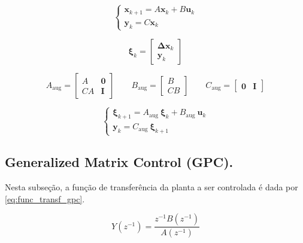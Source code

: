 \documentclass{article}
\begin{document}
\begin{equation}
  \begin{cases}
    \mathbf{x}_{k+1} = A \mathbf{x}_k + B \mathbf{u}_k \\
    \mathbf{y}_k = C \mathbf{x}_k
  \end{cases}
    \label{eq:ss_discreto}
\end{equation}

\begin{equation}
  \mathbf{\xi}_k = \begin{bmatrix}
    \mathbf{\Delta x}_k \\
    \mathbf{y}_k
  \end{bmatrix}
  \label{eq:estados_aug}
\end{equation}

\begin{equation}
  A_\mathrm{aug} = \begin{bmatrix}
    A & \mathbf{0} \\
    C A & \mathbf{I}
  \end{bmatrix} \qquad 
    B_\mathrm{aug} = \begin{bmatrix}
      B \\
      C B
    \end{bmatrix} \qquad
    C_\mathrm{aug} = \begin{bmatrix}
      \mathbf{0} & \mathbf{I}
    \end{bmatrix}
    \label{eq:matrizes_aug}
\end{equation}


\begin{equation}
  \begin{cases}
    \mathbf{\xi}_{k+1} = A_\mathrm{aug}\ \mathbf{\xi}_{k}+ B_\mathrm{aug}\ \mathbf{u}_k \\
    \mathbf{y}_k = C_\mathrm{aug}\ \mathbf{\xi}_{k+1}
  \end{cases}
  \label{eq:ss_discreto_aug}
\end{equation}

\subsection{Generalized Matrix Control (GPC).}

Nesta subseção, a função de transferência da planta a ser controlada é dada por \eqref{eq:func_transf_gpc}.

\begin{equation}
  Y(z^{-1}) = \frac{z^{-1}B(z^{-1})}{A(z^{-1})}
  \label{eq:func_transf_gpc}
\end{equation}
\end{document}
